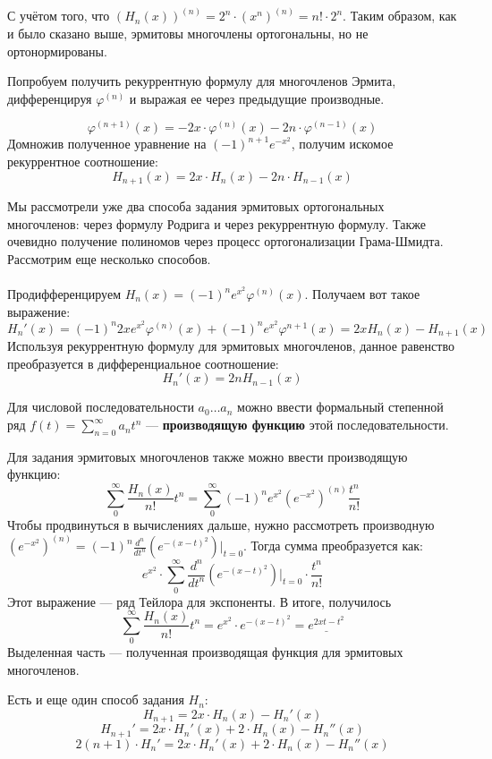 \documentclass[12pt]{article}
\begin{document}
	С учётом того, что $(H_n(x))^{(n)} = 2^n \cdot (x^n)^{(n)} = n! \cdot 2^n$. Таким образом, как 
	и было сказано выше, эрмитовы многочлены ортогональны, но не ортонормированы.
	
	Попробуем получить рекуррентную формулу для многочленов Эрмита, дифференцируя $\varphi^{(n)}$ и выражая ее через предыдущие
	производные.
	
	$$ \varphi^{(n+1)}(x) = -2x \cdot \varphi^{(n)}(x) - 2n \cdot \varphi^{(n-1)}(x) $$
	Домножив полученное уравнение на $(-1)^{n+1} e^{-x^2}$, получим искомое рекуррентное соотношение:
	$$H_{n+1} (x) = 2x \cdot H_n(x) - 2n \cdot H_{n-1} (x)$$
	
	Мы рассмотрели уже два способа задания эрмитовых ортогональных многочленов: через формулу Родрига и через рекуррентную формулу.
	Также очевидно получение полиномов через процесс ортогонализации Грама-Шмидта. Рассмотрим еще несколько способов.\\ \\
	
	Продифференцируем $H_n(x) = (-1)^n e^{x^2} \varphi^{(n)}(x)$. Получаем вот такое выражение:
	$$H_n'(x) = (-1)^n 2x e^{x^2} \varphi^{(n)}(x) + (-1)^n e^{x^2} \varphi^{n+1}(x) = 2x H_n(x) - H_{n+1}(x)$$
	Используя рекуррентную формулу для эрмитовых многочленов, данное равенство преобразуется в дифференциальное соотношение:
	$$H_n'(x) = 2n H_{n-1}(x)$$
	
	\begin{defi}
	Для числовой последовательности $a_0 \dots a_n$ можно ввести формальный степенной ряд $f(t) = \sum_{n=0}^{\infty} a_n t^n$ 
	--- \textbf{производящую функцию} этой последовательности.
	\end{defi}
	
	Для задания эрмитовых многочленов также можно ввести производящую функцию:
	$$\sum_0^{\infty} \frac{H_n(x)}{n!} t^n = \sum_0^{\infty} (-1)^n e^{x^2} (e^{-x^2})^{(n)} \frac{t^n}{n!}$$
	Чтобы продвинуться в вычислениях дальше, нужно рассмотреть производную $(e^{-x^2})^{(n)} =
	(-1)^n \frac{d^n}{dt^n} (e^{-(x-t)^2}) |_{t=0}$. Тогда сумма преобразуется как:
	$$e^{x^2} \cdot \sum_0^{\infty} \frac{d^n}{dt^n} (e^{-(x-t)^2}) |_{t=0} \cdot \frac{t^n}{n!}$$
	Этот выражение --- ряд Тейлора для экспоненты. В итоге, получилось
	$$\sum_0^{\infty} \frac{H_n(x)}{n!} t^n = e^{x^2} \cdot e^{-(x-t)^2} = \underline{e^{2xt - t^2}}$$
	Выделенная часть --- полученная производящая функция для эрмитовых многочленов.
	
	Есть и еще один способ задания $H_n$:
	$$H_{n+1} = 2x \cdot H_n(x) - H_n'(x)$$
	$$H_{n+1}' = 2x \cdot H_n'(x) + 2 \cdot H_n(x) - H_n''(x)$$
	$$2(n+1) \cdot H_n' = 2x \cdot H_n'(x) + 2 \cdot H_n(x) - H_n''(x)$$
	
\end{document}
